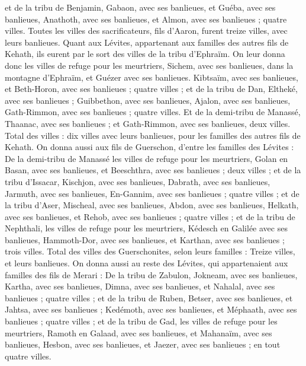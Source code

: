 \begin{multicols}{2}
et de la tribu de Benjamin, Gabaon, avec ses banlieues, et Guéba, avec ses banlieues,
Anathoth, avec ses banlieues, et Almon, avec ses banlieues ; quatre villes.
Toutes les villes des sacrificateurs, fils d’Aaron, furent treize villes, avec leurs banlieues.
Quant aux Lévites, appartenant aux familles des autres fils de Kehath, ils eurent par le sort des villes de la tribu d’Ephraïm.
On leur donna donc les villes de refuge pour les meurtriers, Sichem, avec ses banlieues, dans la montagne d’Ephraïm, et Guézer avec ses banlieues.
Kibtsaïm, avec ses banlieues, et Beth-Horon, avec ses banlieues ; quatre villes ;
et de la tribu de Dan, Eltheké, avec ses banlieues ; Guibbethon, avec ses banlieues,
Ajalon, avec ses banlieues, Gath-Rimmon, avec ses banlieues ; quatre villes.
Et de la demi-tribu de Manassé, Thaanac, avec ses banlieues ; et Gath-Rimmon, avec ses banlieues, deux villes.
Total des villes : dix villes avec leurs banlieues, pour les familles des autres fils de Kehath.
On donna aussi aux fils de Guerschon, d’entre les familles des Lévites : De la demi-tribu de Manassé les villes de refuge pour les meurtriers, Golan en Basan, avec ses banlieues, et Beeschthra, avec ses banlieues ; deux villes ;
et de la tribu d’Issacar, Kischjon, avec ses banlieues, Dabrath, avec ses banlieues,
Jarmuth, avec ses banlieues, En-Gannim, avec ses banlieues ; quatre villes ;
et de la tribu d’Aser, Mischeal, avec ses banlieues, Abdon, avec ses banlieues,
Helkath, avec ses banlieues, et Rehob, avec ses banlieues ; quatre villes ;
et de la tribu de Nephthali, les villes de refuge pour les meurtriers, Kédesch en Galilée avec ses banlieues, Hammoth-Dor, avec ses banlieues, et Karthan, avec ses banlieues ; trois villes.
Total des villes des Guerschonites, selon leurs familles : Treize villes, et leurs banlieues.
On donna aussi au reste des Lévites, qui appartenaient aux familles des fils de Merari : De la tribu de Zabulon, Jokneam, avec ses banlieues, Kartha, avec ses banlieues,
Dimna, avec ses banlieues, et Nahalal, avec ses banlieues ; quatre villes ;
et de la tribu de Ruben, Betser, avec ses banlieues, et Jahtsa, avec ses banlieues ;
Kedémoth, avec ses banlieues, et Méphaath, avec ses banlieues ; quatre villes ;
et de la tribu de Gad, les villes de refuge pour les meurtriers, Ramoth en Galaad, avec ses banlieues, et Mahanaïm, avec ses banlieues,
Hesbon, avec ses banlieues, et Jaezer, avec ses banlieues ; en tout quatre villes.

\end{multicols}
